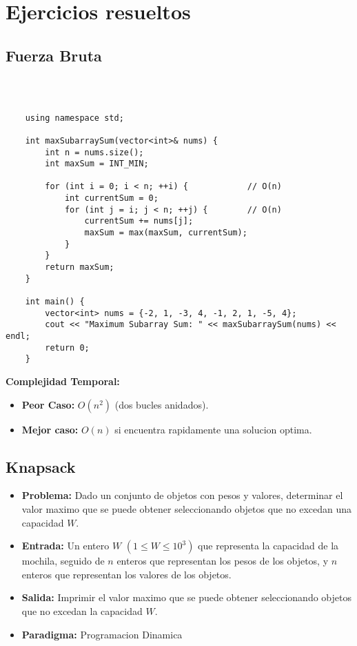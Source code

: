 \section{Ejercicios resueltos}

\subsection{Fuerza Bruta}
    \begin{lstlisting}[style=cpp]
    
    
    
    using namespace std;
    
    int maxSubarraySum(vector<int>& nums) {
        int n = nums.size();
        int maxSum = INT_MIN;
    
        for (int i = 0; i < n; ++i) {            // O(n)
            int currentSum = 0;
            for (int j = i; j < n; ++j) {        // O(n)
                currentSum += nums[j];
                maxSum = max(maxSum, currentSum);
            }
        }
        return maxSum;
    }
    
    int main() {
        vector<int> nums = {-2, 1, -3, 4, -1, 2, 1, -5, 4};
        cout << "Maximum Subarray Sum: " << maxSubarraySum(nums) << endl;
        return 0;
    }
    \end{lstlisting}
    \textbf{Complejidad Temporal: }
    \begin{itemize}
        \item \textbf{Peor Caso: }$O(n^2)$ (dos bucles anidados).
        \item \textbf{Mejor caso: }$O(n)$ si encuentra rapidamente una solucion optima.
    \end{itemize}

\subsection{Knapsack}
\begin{itemize}
  \item \textbf{Problema: }Dado un conjunto de objetos con pesos y valores, determinar el valor maximo que se puede obtener seleccionando objetos que no excedan una capacidad $W$. 
  \item \textbf{Entrada: }Un entero $W$ $(1 \leq W \leq 10^3)$ que representa la capacidad de la mochila, seguido de $n$ enteros que representan los pesos de los objetos, y $n$ enteros que representan los valores de los objetos. 
  \item \textbf{Salida: }Imprimir el valor maximo que se puede obtener seleccionando objetos que no excedan la capacidad $W$. 

  \item \textbf{Paradigma: } Programacion Dinamica
\end{itemize}

